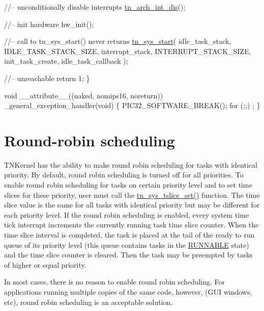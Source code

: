 \begin{DoxyCodeInclude}
   \textcolor{comment}{//-- unconditionally disable interrupts}
   \hyperlink{tn__arch_8h_a2b3f2294ac42a599662c573394b14c75}{tn\_arch\_int\_dis}();

   \textcolor{comment}{//-- init hardware}
   hw\_init();

   \textcolor{comment}{//-- call to tn\_sys\_start() never returns}
   \hyperlink{tn__sys_8h_a62ab25d9d8ca01c02d368968f19e49bf}{tn\_sys\_start}(
         idle\_task\_stack,
         IDLE\_TASK\_STACK\_SIZE,
         interrupt\_stack,
         INTERRUPT\_STACK\_SIZE,
         init\_task\_create,
         idle\_task\_callback
         );

   \textcolor{comment}{//-- unreachable}
   \textcolor{keywordflow}{return} 1;
\}

\textcolor{keywordtype}{void} \_\_attribute\_\_((naked, nomips16, noreturn)) \_general\_exception\_handler(\textcolor{keywordtype}{void})
\{
   PIC32\_SOFTWARE\_BREAK();
   \textcolor{keywordflow}{for} (;;) ;
\}

\end{DoxyCodeInclude}
\hypertarget{quick_guide_round_robin}{}\section{Round-\/robin scheduling}\label{quick_guide_round_robin}
T\+N\+Kernel has the ability to make round robin scheduling for tasks with identical priority. By default, round robin scheduling is turned off for all priorities. To enable round robin scheduling for tasks on certain priority level and to set time slices for these priority, user must call the {\ttfamily \hyperlink{tn__sys_8h_a05fc370b6faa604fd8ff9411361c4cd0}{tn\+\_\+sys\+\_\+tslice\+\_\+set()}} function. The time slice value is the same for all tasks with identical priority but may be different for each priority level. If the round robin scheduling is enabled, every system time tick interrupt increments the currently running task time slice counter. When the time slice interval is completed, the task is placed at the tail of the ready to run queue of its priority level (this queue contains tasks in the \hyperlink{tn__tasks_8h_a5e12e8a0ab280b515f44bf3fee1210a6a02783ac7808aeda318a6f506b7a276dc}{{\ttfamily R\+U\+N\+N\+A\+B\+L\+E}} state) and the time slice counter is cleared. Then the task may be preempted by tasks of higher or equal priority.

In most cases, there is no reason to enable round robin scheduling. For applications running multiple copies of the same code, however, (G\+U\+I windows, etc), round robin scheduling is an acceptable solution. 